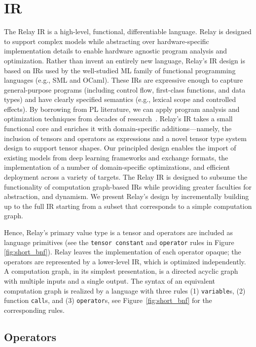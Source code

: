 \section{IR}



The Relay IR is a high-level, functional, differentiable language.
Relay is designed to support
  complex models while abstracting over hardware-specific
  implementation details to enable hardware agnostic program
  analysis and optimization.
Rather than invent an entirely new language,
  Relay's IR design is based on IRs used by the well-studied ML family of
  functional programming languages (e.g., SML and OCaml).
These IRs are expressive enough to capture general-purpose programs
  (including control flow, first-class functions, and data types)
  and have clearly specified semantics (e.g., lexical scope and controlled effects).
By borrowing from PL literature,
  we can apply program analysis and optimization techniques from decades of research~\citep{haskell_vector}.
Relay's IR takes a small functional core and enriches it with domain-specific additions---namely,
  the inclusion of tensors and operators as expressions
  and a novel tensor type system design to support tensor shapes.
Our principled design
  enables the import of existing models from deep learning frameworks and exchange formats,
  the implementation of a number of domain-specific optimizations,
  and efficient deployment across a variety of targets.
The Relay IR is designed
  to subsume the functionality of computation graph-based IRs
  while providing greater faculties for abstraction, and dynamism.
We present Relay's design by incrementally building up to the full IR
  starting from a subset that corresponds to a simple computation graph.

Hence, Relay's primary value type is a tensor and operators are included as language primitives
  (see the \verb|tensor constant| and \verb|operator| rules in Figure \ref{fig:short_bnf}).
Relay leaves the implementation of each operator opaque; the operators
  are represented by a lower-level IR, which is optimized independently.
A computation graph, in its simplest presentation, is a directed acyclic
  graph with multiple inputs and a single output.
The syntax of an equivalent computation graph is realized by
  a language with three rules (1) \verb|variable|s, (2) function \verb|call|s,
  and (3) \verb|operator|s, see Figure~\ref{fig:short_bnf} for the corresponding rules.

\subsection{Operators}

